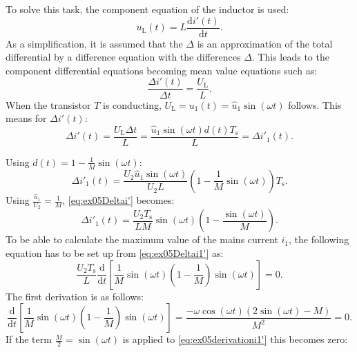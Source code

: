 
\begin{solutionblock}
    To solve this task, the component equation of the inductor is used:
    \begin{equation}
        u_{\mathrm{L}}(t) = L \frac{\mathrm{d}i'(t)}{\mathrm{d}t}.
    \end{equation}
    As a simplification, it is assumed that the $\Delta$ is an approximation of the total differential by a difference equation with the differences $\Delta$. This leads to the component differential equations becoming mean value equations such as:
    \begin{equation}
        \frac{\Delta i'(t)}{\Delta t} = \frac{U_{\mathrm{L}}}{L}.
    \end{equation}
    When the transistor $T$ is conducting, $U_{\mathrm{L}} = u_{\mathrm{1}}(t) = \hat u_{\mathrm{1}} \sin(\omega t)$ follows.
    This means for $\Delta i'(t)$:
\begin{equation}
    \Delta i'(t) = \frac{ U_{\mathrm{L}} \Delta t}{L} = \frac{\hat u_{\mathrm{1}} \sin(\omega t) d(t) T_{\mathrm{s}}}{L} = \Delta i'_{\mathrm{1}}(t).
\end{equation}

Using $d(t) = 1 -\frac{1}{M} \sin(\omega t)$:
 \begin{equation}
     \Delta i'_{\mathrm{1}}(t) = \frac{U_{\mathrm{2}}\hat u_{\mathrm{1}}\sin (\omega t)}{U_{\mathrm{2}}L}(1-\frac{1}{M}\sin(\omega t)) T_{\mathrm{s}}\label{eq:ex05Deltai'}.
 \end{equation}
 Using $\frac{\hat u_{\mathrm{1}}}{U_{\mathrm{2}}} = \frac{1}{M}$, \eqref{eq:ex05Deltai'} becomes:
 \begin{equation}
     \Delta i'_{\mathrm{1}}(t) = \frac{U_{\mathrm{2}}T_{\mathrm{s}}}{LM}\sin (\omega t)(1-\frac{\sin(\omega t)}{M}). \label{eq:ex05Deltai1'}
 \end{equation}
   To be able to calculate the maximum value of the mains current
    $i_\mathrm{1}$, the following equation has to be set up from \eqref{eq:ex05Deltai1'} as:
    \begin{equation}
        \frac{U_{\mathrm{2}}T_{\mathrm{s}}}{L} \frac{\mathrm{d}}{\mathrm{d}t}\left[\frac{1}{M}\sin(\omega t)\left(1-\frac{1}{M}\right)\sin(\omega t)\right] =0.
    \end{equation}
    The first derivation is as follows:
    \begin{equation}
        \frac{\mathrm{d}}{\mathrm{d}t}\left[\frac{1}{M}\sin(\omega t)\left(1-\frac{1}{M}\right)\sin(\omega t)\right] =\frac{-\omega \cos(\omega t)(2\sin(\omega t)-M)}{M^2}=0.\label{eq:ex05derivationi1'}
    \end{equation}
    If the term $\frac{M}{2}=\sin(\omega t)$ is applied to \eqref{eq:ex05derivationi1'} this becomes zero:


\end{solutionblock}
